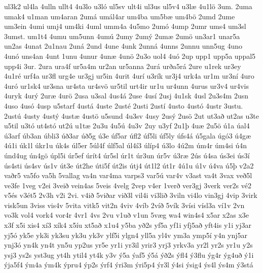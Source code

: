 {ul3k2
ul4la
4ulln
ullt4
4u3lo
u3l^^f3
ul5sv
ult4i
ul3us
ul5v4
u3l^^e6
4u1l^^f6
3um.
2uma
umak4
u1man
um4aran
2um^^e1
um^^e1l4ar
um4ba
um5b^^e6
um4b^^f6
2umd
2ume
um3ein
4umi
umj4
um4ki
4uml
umm4a
4u5mo
2um^^f3
4ump
2umr
ums4
um3sl
3umst.
um1t4
4umu
um5unn
4um^^fa
2umy
2um^^fd
2um^^e6
2um^^f6
un3ar1
unar5a
un2as
4unat
2u1nau
2un^^e1
2und
4une
4unk
2unn^^e1
4unns
2unnu
unn5ug
4uno
4un^^f3
uns4an
4unt
1unu
4unur
4un^^e6
4un^^f6
2u3o
uol4
4u^^f3
2up
upp1
upp5a
uppal5
upp4i
3ur.
2ura
ura4f
ur5a4m
ur2an
ur5anna
2ur^^e1
ur^^f0a5r^^e1
2ure
u1rek
ur3ey
4u1r^^e9
urf4a
ur3fl
urg4e
ur3gj
ur5in
4urit
4ur^^ed
u3r^^edk
ur3j4
urk4a
ur1m
ur3n^^ed
4uro
4ur^^f3
ur1sk4
ur3sna
ur4sta
ur4sv^^f6
ur5til
urt4ir
ur1u
ur4unn
4urus
ur3v4
ur4vis
4uryk
4ur^^fd
2ur^^e6
4ur^^f6
2usa
u3sal
4us4^^e1
2use
4us^^ed
2usj
4u1sk
4usl
2u3s4m
2usn
4uso
4us^^f3
4usp
u5starf
4ust^^e1
4uste
2ust^^e9
2usti
2ust^^ed
4usto
4ust^^f3
4ustr
3ustu.
2ust^^fa
4usty
4ust^^fd
4ust^^e6
4ust^^f6
u5sund
4u3sv
4usy
2us^^fd
2us^^f6
2ut
ut3a^^f0
ut2as
u3te
u5til
u3t^^f3
ut4st^^f3
ut2^^fa
u1t^^e6
2u3u
4u5^^fa
4u3v
2uy
u3yf
2u1^^fe
4u^^e6
2u5^^f6
^^fa1a
^^faal4
^^fa3arf
^^fab3an
^^fabli3
^^fa^^f03ar
^^fa^^f05g
^^fa3e
^^faf5ar
^^fafl2
^^faf5li
^^faf5ly
^^fafs4^^e1
^^fa5gala
^^fag^^f33
^^fa4g^^e6
4^^fa1i
^^fak1l
^^fakr1u
^^fak4s
^^fal5er
5^^fal4f
^^falf5al
^^fal4^^ed3
^^fal^^edp4
^^fa3lo
4^^fa2m
^^fam4r
^^fam4si
^^fa4n
^^fand4ug
^^fan4g^^f6
^^fapl5i
^^far5ef
^^far^^edt4
^^far5sl
^^far1t
^^far3un
^^far5v
^^fa3r^^e6
2^^fas
^^fa4sa
^^fas3ei
^^fas3^^ed
^^fas4sti
^^fas4sv
^^fas1v
^^fat3e
^^fat2he
^^fati5f
^^fat2is
^^fatj4
^^fat1l2
^^fat1r
4^^fa1u
^^fa1v
^^fa4va
^^fa5^^fe
v2a2
va^^f0r5
va5fo
va5h
5vallag
va4n
var4ma
varps3
var5^^fa
var4v
v3ast
va4t
3vax
ve^^f05l
ve3fe
1veg
v2ei
3vei^^f0
vein4as
5veis
4velg
2vep
v4er
1ver^^f0
ver3gj
3verk
ver2s
v^^e92
v5^^e9s
v3^^e9t5
2v3h
v2i
2vi.
v4i^^f0
5vi^^f0ar
vi^^f03l
vil4i
vi3li^^f0
3viln
vi4lo
vin3gj
4vip
3virk
visk5un
3viss
vis4v
5vita
vitk5
vit2n
4viv
4v^^edb
2v^^ed^^f0
5v^^edk
3v^^edsi
v^^edsl3a
v^^ed1v
2vn
vo3k
vol4
vork4
vor4r
4vr1
4vs
2vu
v1u^^f0
v1un
5v^^e6g
wa4
win4s4
x5ar
x2as
x3e
x3f
x5i
xis4
x^^ed3
x^^edk4
x5^^edu
xt5a^^f0
x1u4
y5ba
y^^f02s
yf5a
yf1i
yfj5a^^f0
yft4is
y1i
yj3ar
yj5^^f3
yk5e
yk3i
yk3su
yk3u
yk3v
ylf5i
ylgn4
yll5a
yl4v
ym3a
ymp5^^ed
y4n
ynj5ar
ynj3^^f3
yn4k
yn4t
yn5u
yp2us
yr5e
yr1i
yr3il
yrir3
yrj3
yrkv3a
yr2l
yr2s
yr1u
y2s
ysj3
ys2s
yst3ug
yt4h
ytil4
yt4k
y3v
^^fd5a
^^fdaf5
^^fd5^^e1
^^fd^^f02s
^^fdfl4
^^fd3flu
^^fdg4r
^^fdg4u^^f0
^^fd1i
^^fdja5f4
^^fdm4a
^^fdm4k
^^fdpru4
^^fdp2s
^^fdrf4
^^fdri3m
^^fdri5p4
^^fdr3l
^^fd4si
^^fdsig4
^^fds4l
^^fds4m
^^fd3st^^e1
}
